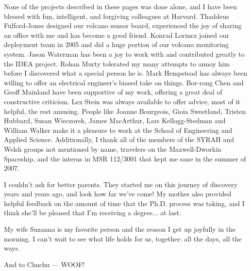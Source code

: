 None of the projects described in these pages was done alone, and I have been
blessed with fun, intelligent, and forgiving colleagues at Harvard. Thaddeus
Fulford-Jones designed our volcano sensor board, experienced the joy of
sharing an office with me and has become a good friend. Konrad Lorincz joined
our deployment team in 2005 and did a huge portion of our volcano monitoring
system. Jason Waterman has been a joy to work with and contributed greatly to
the IDEA project. Rohan Murty tolerated my many attempts to annoy him before
I discovered what a special person he is. Mark Hempstead has always been
willing to offer an electrical engineer's biased take on things. Bor-rong
Chen and Geoff Mainland have been supportive of my work, offering a great
deal of constructive criticism. Lex Stein was always available to offer
advice, most of it helpful, the rest amusing. People like Joanne Bourgeois,
Gioia Sweetland, Tristen Hubbard, Susan Wieczorek, James MacArthur, Lars
Kellogg-Stedman and William Walker make it a pleasure to work at the School
of Engineering and Applied Science. Additionally, I thank all of the members
of the SYRAH and Welsh groups not mentioned by name, travelers on the
Maxwell-Dworkin Spaceship, and the interns in MSR 112/3001 that kept me sane
in the summer of 2007.

\clearpage

I couldn't ask for better parents. They started me on this journey of
discovery years and years ago, and look how far we've come! My mother also
provided helpful feedback on the amount of time that the Ph.D. process was
taking, and I think she'll be pleased that I'm receiving a degree... at last.

My wife Suzanna is my favorite person and the reason I get up joyfully in the
morning. I can't wait to see what life holds for us, together: all the days,
all the ways.

And to Chuchu --- WOOF!
